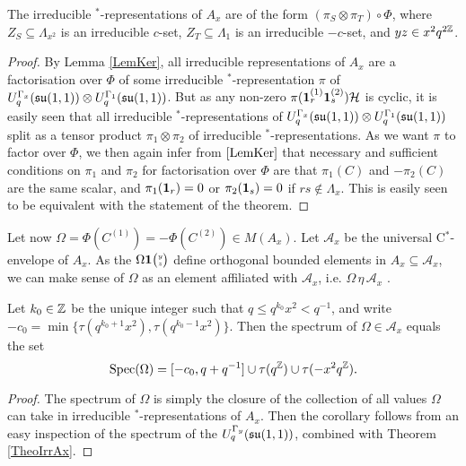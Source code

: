 \begin{Theorem}\label{TheoIrrAx} The irreducible $^*$-representations of $A_x$ are of the form $(\pi_S\otimes \pi_T)\circ \Phi$, where $Z_S \subseteq \Lambda_{x^2}$ is an irreducible $c$-set, $Z_T \subseteq \Lambda_1$ is an irreducible $-c$-set, and $yz \in x^2q^{2\mathbb{Z}}$. 
\end{Theorem}


\begin{proof} By Lemma \ref{LemKer}, all irreducible representations of $A_x$ are a factorisation over $\Phi$ of some irreducible $^*$-representation $\pi$ of $U_q^{\Gamma_x}(\mathfrak{su}(1,1))\otimes U_q^{\Gamma_1}(\mathfrak{su}(1,1))$. But as any non-zero $\pi(\mathbf{1}_r^{(1)}\mathbf{1}_s^{(2)})\mathcal{H}$ is cyclic, it is easily seen that all irreducible $^*$-representations of $U_q^{\Gamma_x}(\mathfrak{su}(1,1))\otimes U_q^{\Gamma_1}(\mathfrak{su}(1,1))$ split as a tensor product $\pi_1\otimes \pi_2$ of irreducible $^*$-representations. As we want $\pi$ to factor over $\Phi$, we then again infer from $\ref{LemKer}$ that necessary and sufficient conditions on $\pi_1$ and $\pi_2$ for factorisation over $\Phi$ are that $\pi_1(C)$ and $-\pi_2(C)$ are the same scalar, and $\pi_1(\mathbf{1}_r)=0$ or $\pi_2(\mathbf{1}_s)=0$ if $rs\notin \Lambda_x$. This is easily seen to be equivalent with the statement of the theorem.
\end{proof}

Let now $\Omega = \Phi(C^{(1)}) = -\Phi(C^{(2)}) \in M(A_x)$. Let $\mathcal{A}_x$ be the universal C$^*$-envelope of $A_x$. As the $\Omega\mathbf{1}{\tiny {\begin{pmatrix} y\\z\end{pmatrix}}}$ define orthogonal bounded elements in $A_x\subseteq \mathcal{A}_x$, we can make sense of $\Omega$ as an element affiliated with $\mathcal{A}_x$, i.e. $\Omega\,\eta\,\mathcal{A}_x$ \cite{Wor2}. 


\begin{Cor} Let $k_0\in \mathbb{Z}$ be the unique integer such that $q\leq q^{k_0}x^2<q^{-1}$, and write $-c_{0} = \min \{\tau(q^{k_0+1}x^2),\tau(q^{k_0-1}x^{2})\}$. Then the spectrum of $\Omega \in \mathcal{A}_x$ equals the set \[\operatorname{\mathrm{Spec}}(\Omega) = \lbrack -c_0,q+q^{-1}\rbrack \cup \tau(q^{\mathbb{Z}})\cup \tau (-x^2q^{\mathbb{Z}}).\]
\end{Cor}
\begin{proof} The spectrum of $\Omega$ is simply the closure of the collection of all values $\Omega$ can take in irreducible $^*$-representations of $A_x$. Then the corollary follows from an easy inspection of the spectrum of the $U_q^{\Gamma_y}(\mathfrak{su}(1,1))$, combined with Theorem \ref{TheoIrrAx}.

\end{proof} 

